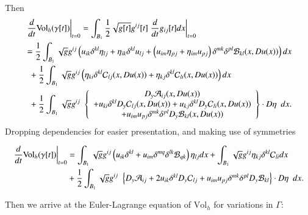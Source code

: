 \documentclass[12pt,leqno]{amsart}%
\theoremstyle{plain}
\numberwithin{equation}{section}
\theoremstyle{definition}
\begin{document}
Then
\begin{align*}
&  \left.  \frac{d}{dt} \mbox{Vol}_{h}(\gamma\lbrack t]) \right|  _{t=0}
=\int_{B_{1}}\frac{1}{2}\sqrt{g[t]}g^{ij}[t]\left.  \frac{d}{dt}g_{ij}[t] dx
\right|  _{t=0}\\
&  =\frac{1}{2}\int_{B_{1}}\sqrt{g}g^{ij}\left(  u_{ik}\delta^{kl}\eta
_{lj}+\eta_{ik}\delta^{kl}u_{lj}+\left(  u_{im}\eta_{pj}+\eta_{im}%
u_{pj}\right)  \delta^{mk}\delta^{pl}{\mathcal{B}}_{kl}(x,Du(x))\right)  dx\\
&  \ \ +\frac{1}{2}\int_{B_{1}}\sqrt{g}g^{ij}\left(  \eta_{ki}\delta
^{kl}{\mathcal{C}}_{lj}(x,Du(x))+\eta_{kj}\delta^{kl}{\mathcal{C}}%
_{li}(x,Du(x))\right)  dx\\
&  \ \ +\frac{1}{2}\int_{B_{1}}\sqrt{g}g^{ij}
\begin{array}
[c]{c}%
\left\{
\begin{array}
[c]{c}%
D_{y}{\mathcal{A}}_{ij}(x,Du(x))\\
+u_{ki}\delta^{kl}D_{y}{\mathcal{C}}_{lj}(x,Du(x))+u_{kj}\delta^{kl}%
D_{y}{\mathcal{C}}_{li}(x,Du(x))\\
+u_{im}u_{pj}\delta^{mk}\delta^{pl}D_{y}{\mathcal{B}}_{kl}(x,Du(x))
\end{array}
\right\}  \cdot D\eta
\end{array}
dx.
\end{align*}
Dropping dependencies for easier presentation, and making use of symmetries%

\begin{align*}
\left.  \frac{d}{dt}\mbox{Vol}_{h}(\gamma[t])\right|  _{t=0}  &  =\int_{B_{1}%
}\sqrt{g}g^{ij}\left(  u_{ik}\delta^{kl}+u_{im}\delta^{mq}\delta
^{lk}{\mathcal{B}}_{qk}\right)  \eta_{lj}dx+\int_{B_{1}}\sqrt{g}g^{ij}%
\eta_{kj}\delta^{kl}{\mathcal{C}}_{li}dx\\
&  +\frac{1}{2}\int_{B_{1}}\sqrt{g}g^{ij}
\begin{array}
[c]{c}%
\left\{  D_{y}{\mathcal{A}}_{ij}+2u_{ik}\delta^{kl}D_{y}{\mathcal{C}}%
_{lj}+u_{im}u_{pj}\delta^{mk}\delta^{pl}D_{y}{\mathcal{B}}_{kl}\right\}  \cdot
D\eta
\end{array}
dx.
\end{align*}


Then we arrive at the Euler-Lagrange equation of $\mbox{Vol}_{h}$ for
variations in $\Gamma$:
\end{document}
